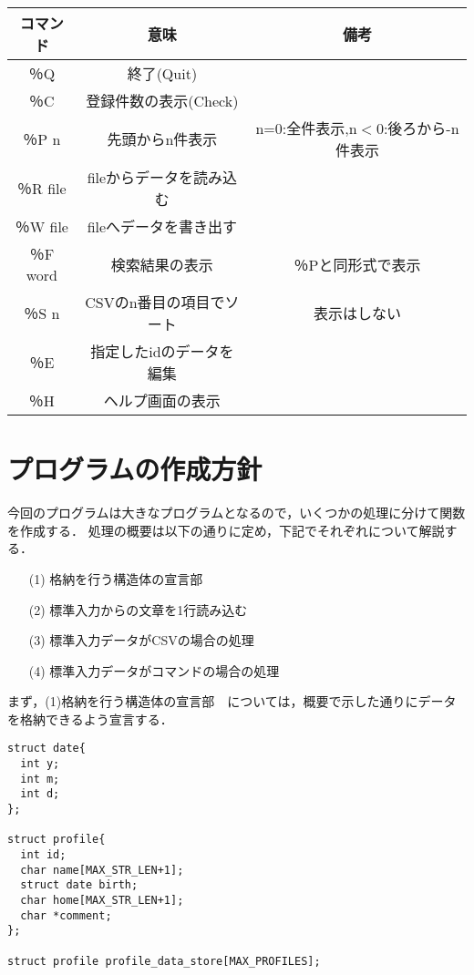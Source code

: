 \documentclass[a4j]{jarticle}
\begin{document}
\begin{enumerate}
\begin{center}
\begin{tabular}{|c|c|c|}\hline
コマンド&意味&備考\\ \hline
％Q&終了(Quit)&\\ \hline
％C&登録件数の表示(Check)&\\ \hline
％P n&先頭からn件表示&n=0:全件表示,n$<$0:後ろから-n件表示\\ \hline
％R file&fileからデータを読み込む&\\ \hline
％W file&fileへデータを書き出す&\\ \hline
％F word&検索結果の表示&％Pと同形式で表示\\ \hline
％S n&CSVのn番目の項目でソート&表示はしない\\ \hline
％E&指定したidのデータを編集&\\ \hline
％H&ヘルプ画面の表示&\\ \hline
\end{tabular}
\end{center}

\end{enumerate}


%
%

\section{プログラムの作成方針}

今回のプログラムは大きなプログラムとなるので，いくつかの処理に分けて関数を作成する．
処理の概要は以下の通りに定め，下記でそれぞれについて解説する．
\begin{itemize}
\item[(1)]格納を行う構造体の宣言部
\item[(2)]標準入力からの文章を1行読み込む
\item[(3)]標準入力データがCSVの場合の処理
\item[(4)]標準入力データがコマンドの場合の処理
\end{itemize}

まず，(1)格納を行う構造体の宣言部　については，概要で示した通りにデータを格納できるよう宣言する．

{\baselineskip 3mm
\begin{verbatim}
struct date{
  int y;
  int m;
  int d;
};

struct profile{
  int id;
  char name[MAX_STR_LEN+1];
  struct date birth;
  char home[MAX_STR_LEN+1];
  char *comment;
};

struct profile profile_data_store[MAX_PROFILES];
\end{verbatim}
}
\end{document}
